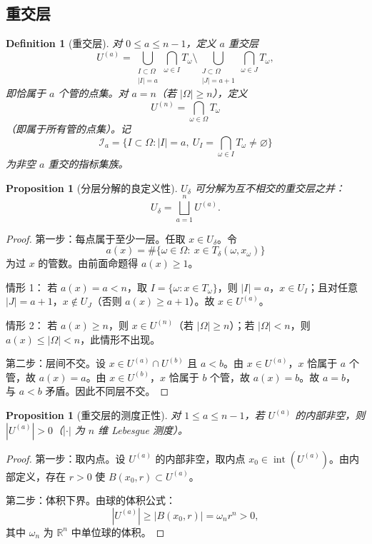 \documentclass[11pt,a4paper]{article}
\newtheorem{proposition}[theorem]{Proposition}
\newtheorem{definition}[theorem]{Definition}
\theoremstyle{remark}
\begin{document}
	\subsection{重交层}
	\begin{definition}[重交层]
		对 $0\le a\le n-1$，定义 $a$ 重交层
		\[
		U^{(a)}=\bigcup_{\substack{I\subset\Omega\\|I|=a}}\bigcap_{\omega\in I}T_\omega
		\setminus\bigcup_{\substack{J\subset\Omega\\|J|=a+1}}\bigcap_{\omega\in J}T_\omega,
		\]
		即恰属于 $a$ 个管的点集。对 $a=n$（若 $|\Omega|\ge n$），定义
		\[
		U^{(n)}=\bigcap_{\omega\in\Omega}T_\omega
		\]
		（即属于所有管的点集）。记
		\[
		\mathcal I_a=\{I\subset\Omega:|I|=a,\ U_I=\bigcap_{\omega\in I}T_\omega\neq\varnothing\}
		\]
		为非空 $a$ 重交的指标集族。
	\end{definition}
	
	\begin{proposition}[分层分解的良定义性]
		$U_\delta$ 可分解为互不相交的重交层之并：
		\[
		U_\delta=\bigsqcup_{a=1}^{n}U^{(a)}.
		\]
	\end{proposition}
	
	\begin{proof}
		第一步：每点属于至少一层。任取 $x\in U_\delta$。令
		\[
		a(x)=\#\{\omega\in\Omega:\ x\in T_\delta(\omega,x_\omega)\}
		\]
		为过 $x$ 的管数。由前面命题得 $a(x)\ge1$。
		
		情形 1： 若 $a(x)=a<n$，取 $I=\{\omega:x\in T_\omega\}$，则 $|I|=a$，$x\in U_I$；且对任意 $|J|=a+1$，$x\notin U_J$（否则 $a(x)\ge a+1$）。故 $x\in U^{(a)}$。
		
		情形 2： 若 $a(x)\ge n$，则 $x\in U^{(n)}$（若 $|\Omega|\ge n$）；若 $|\Omega|<n$，则 $a(x)\le|\Omega|<n$，此情形不出现。
		
		第二步：层间不交。设 $x\in U^{(a)}\cap U^{(b)}$ 且 $a<b$。由 $x\in U^{(a)}$，$x$ 恰属于 $a$ 个管，故 $a(x)=a$。由 $x\in U^{(b)}$，$x$ 恰属于 $b$ 个管，故 $a(x)=b$。故 $a=b$，与 $a<b$ 矛盾。因此不同层不交。
	\end{proof}
	
	\begin{proposition}[重交层的测度正性]
		对 $1\le a\le n-1$，若 $U^{(a)}$ 的内部非空，则 $|U^{(a)}|>0$（$|\cdot|$ 为 $n$ 维 Lebesgue 测度）。
	\end{proposition}
	
	\begin{proof}
		第一步：取内点。设 $U^{(a)}$ 的内部非空，取内点 $x_0\in\operatorname{int}(U^{(a)})$。由内部定义，存在 $r>0$ 使 $B(x_0,r)\subset U^{(a)}$。
		
		第二步：体积下界。由球的体积公式：
		\[
		|U^{(a)}|\ge|B(x_0,r)|=\omega_nr^n>0,
		\]
		其中 $\omega_n$ 为 $\mathbb R^n$ 中单位球的体积。
	\end{proof}
	
\end{document}
